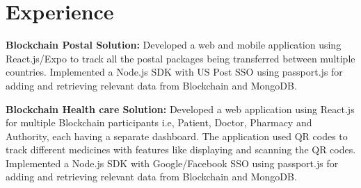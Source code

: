 \documentclass[letterpaper]{amir-resume} %
\begin{document}
\begin{minipage}[t]{0.66\textwidth} %


\section{Experience}


\vspace{\topsep} %
\begin{tightitemize}
\item  {\bf Blockchain Postal Solution:}  \justifying Developed a web and mobile application using React.js/Expo to track all the postal packages being transferred between multiple countries. Implemented a Node.js SDK with US Post SSO using passport.js for adding and retrieving relevant data from Blockchain and MongoDB.
\item {\bf Blockchain Health care Solution:}  Developed a web application using React.js for multiple Blockchain participants i.e, Patient, Doctor, Pharmacy and Authority, each having a separate dashboard. The application used QR codes to track different medicines with features like displaying and scanning the QR codes. Implemented a Node.js SDK with Google/Facebook SSO using passport.js for adding and retrieving relevant data from Blockchain and MongoDB.
\end{tightitemize}

\sectionspace %




\end{minipage}
\end{document}
